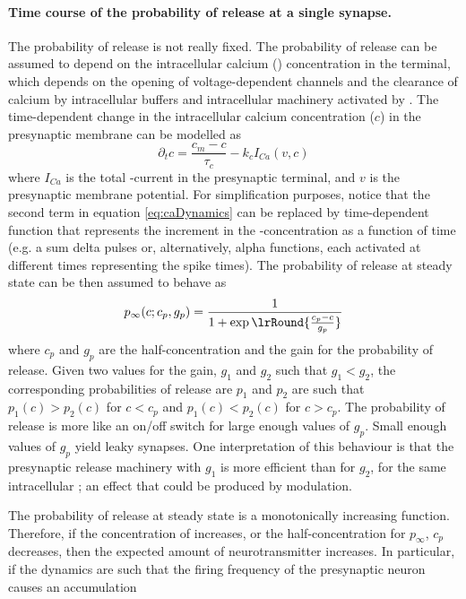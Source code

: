 \paragraph{Time course of the probability of release at a single synapse.} The probability of release is not really fixed. The probability of release can be assumed to depend on the intracellular calcium ({\calcium}) concentration in the terminal, which depends on the opening of voltage-dependent channels and the clearance of calcium by intracellular buffers and intracellular machinery activated by {\calcium}. The time-dependent change in the  intracellular calcium concentration ($c$) in the presynaptic membrane can be modelled as \citep{AvRonParnasSegel1993} 
\begin{equation}
\partial_t c = \frac{c_m - c}{\tau_c}  - k_c I_{Ca}(v,c)
\label{eq:caDynamics}
\end{equation}
where $I_{Ca}$ is the total {\calcium}-current in the presynaptic terminal, and $v$ is the presynaptic membrane potential.  For simplification purposes, notice that the second term in equation \eqref{eq:caDynamics} can be replaced by time-dependent function that represents the increment in the {\calcium}-concentration as a function of time (e.g. a sum delta pulses or, alternatively, alpha functions, each activated at different times  representing the spike times). The probability of release at steady state can be then assumed to behave as 
\begin{equation}
p_{\infty}(c; c_p, g_p) = \frac{1}{1+ \exp\lrRound{ \frac{c_p -  c}{g_p}}}
\label{ssPRelease}
\end{equation}
where $c_p$ and $g_p$ are the half-concentration and the gain for the probability of release.  Given two values for the gain, $g_1$ and $g_2$ such that $g_{1}< g_{2}$, the corresponding probabilities of release are $p_1$ and $p_2$ are such that 
$p_1(c) > p_2(c)$ for $c<c_p$ and $p_1(c) < p_2(c)$ for $c>c_p$. 
The probability of release is more like an on/off switch for large enough values of $g_p$. Small enough values of $g_p$ yield leaky synapses. One interpretation of this behaviour is that the presynaptic release machinery with $g_1$ is more efficient than for $g_2$, for the same intracellular {\calcium}; an effect that could be produced by modulation. 

The probability of release at steady state is a monotonically increasing function. Therefore, if the concentration of {\calcium} increases, or the half-concentration for $p_{\infty}$, $c_p$ decreases, then the expected amount of neurotransmitter increases. In particular, if the {\calcium} dynamics are such that the firing frequency of the presynaptic neuron causes an accumulation


